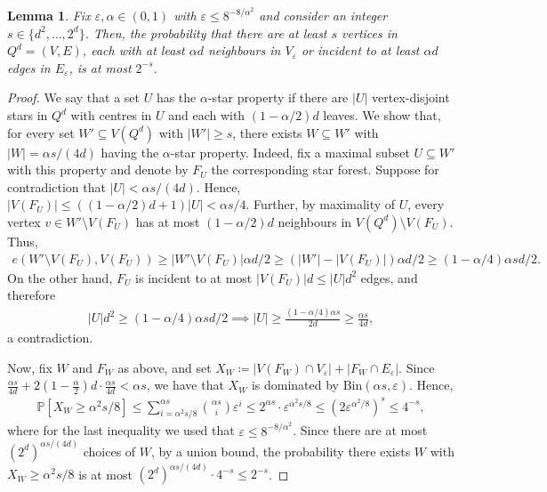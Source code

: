 \documentclass{article}
\newtheorem{lemma}[thm]{Lemma}
\theoremstyle{definition}
\newcommand{\eps}{\varepsilon}
\begin{document}
\begin{lemma}\label{lem: decent vertices}
Fix $\eps,\alpha\in (0,1)$ with $\eps \le 8^{-8/\alpha^2}$ and consider an integer $s\in \{d^2,\ldots, 2^d\}$. 
Then, the probability that there are at least $s$ vertices in $Q^d=(V,E)$, each with at least $\alpha d$ neighbours in $V_\eps$ or incident to at least $\alpha d$ edges in $E_{\eps}$, is at most $2^{-s}$.
\end{lemma}
\begin{proof}
We say that a set $U$ has the $\alpha$-star property if there are $|U|$ vertex-disjoint stars in $Q^d$ with centres in $U$ and each with $(1-\alpha/2)d$ leaves.
We show that, for every set $W'\subseteq V(Q^d)$ with $|W'|\ge s$, there exists  $W\subseteq W'$ with $|W| = \alpha s/(4d)$ having the $\alpha$-star property.
Indeed, fix a maximal subset $U\subseteq W'$ with this property and denote by $F_U$ the corresponding star forest. 
Suppose for contradiction that $|U|<\alpha s/(4d)$. Hence, $|V(F_U)|\leq \left((1-\alpha/2)d+1\right)|U|<\alpha s/4$.
        Further, by maximality of $U$, every vertex $v\in W'\setminus V(F_U)$ has at most $(1-\alpha/2)d$ neighbours in $V(Q^d)\setminus V(F_U)$. Thus, 
    \begin{align*}
     e(W'\setminus V(F_U), V(F_U))\ge |W'\setminus V(F_U)|\alpha d/2\ge (|W'|-|V(F_U)|)\alpha d/2\ge (1-\alpha/4)\alpha sd/2.
    \end{align*}
    On the other hand, $F_U$ is incident to at most $|V(F_U)|d\le |U|d^2$ edges, and therefore
    \begin{align*}
        |U|d^2\ge (1-\alpha/4)\alpha sd/2\implies |U|\ge \frac{(1-\alpha/4)\alpha s}{2d}\ge \frac{\alpha s}{4d},
    \end{align*}
    a contradiction.  

    Now, fix $W$ and $F_W$ as above, and set $X_W\coloneqq|V(F_W)\cap V_\eps|+|F_W\cap E_\eps|$. Since $\frac{\alpha s}{4d}+2\left(1-\frac{\alpha}{2}\right)d\cdot\frac{\alpha s}{4d}< \alpha s$, we have that $X_W$ is dominated by $\mathrm{Bin}(\alpha s,\varepsilon)$. Hence,
    \begin{align*}
    \mathbb P[X_W\geq \alpha^2 s/8]\leq\sum_{i=\alpha^2 s/8}^{\alpha s}\binom{\alpha s}{i}\varepsilon^{i}\leq 2^{\alpha s}\cdot \varepsilon^{\alpha^2s/8}\leq(2\eps^{\alpha^2/8})^{s}\leq 4^{-s},
    \end{align*}
    where for the last inequality we used that $\eps\le 8^{-8/\alpha^2}$. Since there are at most $(2^d)^{\alpha s/(4d)}$ choices of $W$, by a union bound, the probability there exists $W$ with $X_W\geq \alpha^2 s/8$ is at most $(2^d)^{\alpha s/(4d)}\cdot 4^{-s}\le 2^{-s}$.


\end{proof}
\end{document}
